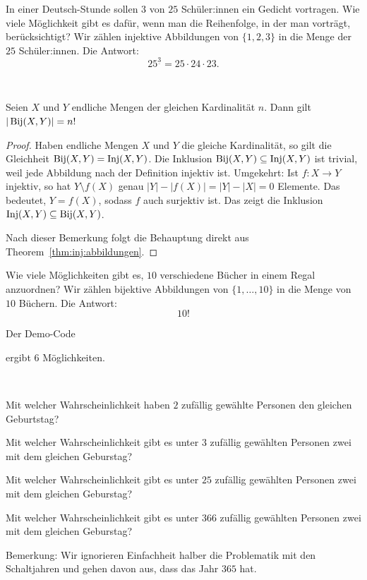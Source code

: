 \begin{bsp}
		In einer Deutsch-Stunde sollen  $3$ von $25$ Schüler:innen ein Gedicht vortragen. Wie viele Möglichkeit gibt es dafür, wenn man die Reihenfolge, in der man vorträgt, berücksichtigt? Wir zählen injektive Abbildungen von $\{1,2,3\}$ in die Menge der $25$ Schüler:innen. Die Antwort: 
		\[
			25^{\underline{3}} = 25 \cdot 24 \cdot 23. 
		\]
\end{bsp} 

\begin{bem}\
 
\end{bem}

\begin{kor}
	 Seien $X$ und $Y$ endliche Mengen der gleichen Kardinalität $n$. Dann gilt $|\operatorname{Bij}(X,Y)| = n!$
\end{kor} 
\begin{proof}
	Haben endliche Mengen $X$ und $Y$ die gleiche Kardinalität, so gilt die Gleichheit $\operatorname{Bij}(X,Y ) = \operatorname{Inj}(X,Y)$. Die Inklusion $\operatorname{Bij}(X,Y ) \subseteq \operatorname{Inj}(X,Y)$ ist trivial, weil jede Abbildung nach der Definition injektiv ist. Umgekehrt: Ist $f: X \to Y$ injektiv, so hat $Y \setminus f(X)$ genau $|Y| - |f(X)| = |Y| - |X| =0$ Elemente. Das bedeutet, $Y = f(X)$, sodass $f$ auch surjektiv ist. Das zeigt die Inklusion $\operatorname{Inj}(X,Y) \subseteq \operatorname{Bij}(X,Y)$. 
	
	Nach dieser Bemerkung folgt die Behauptung direkt aus Theorem~\ref{thm:inj:abbildungen}. 
\end{proof} 

\begin{bsp}
	Wie viele Möglichkeiten gibt es, $10$ verschiedene Bücher in einem Regal anzuordnen? Wir zählen bijektive Abbildungen von $\{1,\ldots,10\}$ in die Menge von $10$ Büchern. Die Antwort: 
	\[
			10!
	\]
\end{bsp} 

\begin{bem} Der Demo-Code 

ergibt $6$ Möglichkeiten. 
\end{bem} 

\begin{aufg}[Geburtstage]\
	\begin{enuma}
		\item Mit welcher Wahrscheinlichkeit haben $2$ zufällig gewählte Personen den gleichen Geburtstag? 
		\item Mit welcher Wahrscheinlichkeit gibt es unter $3$ zufällig gewählten Personen zwei mit dem gleichen Geburstag?
		\item Mit welcher Wahrscheinlichkeit gibt es unter $25$ zufällig gewählten Personen zwei mit dem gleichen Geburstag?
		\item Mit welcher Wahrscheinlichkeit gibt es unter $366$ zufällig gewählten Personen zwei mit dem gleichen Geburstag? 
	\end{enuma}
	Bemerkung: Wir ignorieren Einfachheit halber die Problematik mit den Schaltjahren und gehen davon aus, dass das Jahr $365$ hat. 
\end{aufg} 

